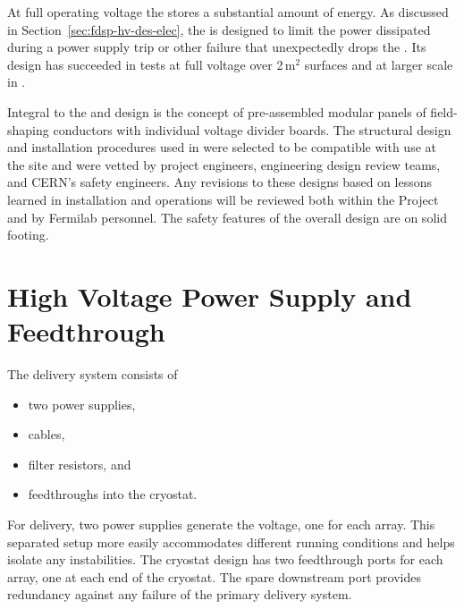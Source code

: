 At full operating voltage the  stores a substantial amount of energy.
As discussed in Section~\ref{sec:fdsp-hv-des-elec}, the  is designed to limit the power dissipated during a power supply trip or other failure that unexpectedly drops the .
Its design has succeeded in tests at full voltage over \num{2}\,m$^2$ surfaces and at larger scale in .  

Integral to the  and  design is the concept of pre-assembled modular panels of field-shaping conductors with individual voltage divider boards. The structural design and installation procedures used in  were selected to be compatible with use at the  site and were vetted by project engineers, engineering design review teams, and CERN's safety engineers. Any revisions to these designs based on lessons learned in   installation and operations will be reviewed both within the Project and by Fermilab  personnel. The safety features of the overall design are on solid footing. 




\section {High Voltage Power Supply and Feedthrough}

The  delivery system consists of
\begin{itemize}
\item two power supplies,
\item {} cables,
\item filter resistors, and
\item {} feedthroughs into the cryostat.
\end{itemize}

For  delivery, two power supplies generate the voltage, one for each  array. 
This separated setup more easily accommodates different running conditions and helps isolate any instabilities. 
The cryostat design has two feedthrough ports for each  array, one at each end of the cryostat. The spare downstream port provides redundancy against any failure of the primary  delivery system. 

